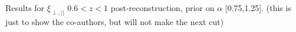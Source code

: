 \label{fig:HDA_z60_alpha0.25} Results for $\xi_{\perp, ||}$ $0.6<z<1$ post-reconstruction, prior on $\alpha$ [0.75,1.25]. (this is just to show the co-authors, but will not make the next cut)